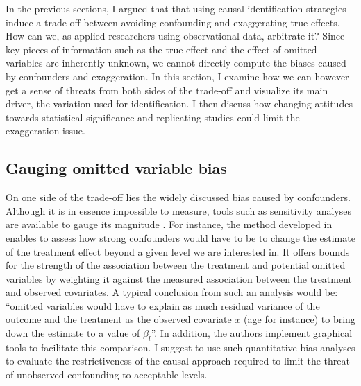 \documentclass[usletter, 12pt]{article}
\begin{document}
 		In the previous sections, I argued that that using causal identification strategies induce a trade-off between avoiding confounding and exaggerating true effects. How can we, as applied researchers using observational data, arbitrate it? Since key pieces of information such as the true effect and the effect of omitted variables are inherently unknown, we cannot directly compute the biases caused by confounders and exaggeration. In this section, I examine how we can however get a sense of threats from both sides of the trade-off and visualize its main driver, the variation used for identification. I then discuss how changing attitudes towards statistical significance and replicating studies could limit the exaggeration issue.
	
	
		\subsection{Gauging omitted variable bias}
	
			On one side of the trade-off lies the widely discussed bias caused by confounders. Although it is in essence impossible to measure, tools such as sensitivity analyses are available to gauge its magnitude \citep{rosenbaum_observational_2002, middleton_bias_2016, oster_unobservable_2019, cinelli_making_2020}. For instance, the method developed in \cite{cinelli_making_2020} enables to assess how strong confounders would have to be to change the estimate of the treatment effect beyond a given level we are interested in. It offers bounds for the strength of the association between the treatment and potential omitted variables by weighting it against the measured association between the treatment and observed covariates. A typical conclusion from such an analysis would be: ``omitted variables would have to explain as much residual variance of the outcome and the treatment as the observed covariate $x$ (age for instance) to bring down the estimate to a value of $\beta_{l}$''. In addition, the authors implement graphical tools to facilitate this comparison. I suggest to use such quantitative bias analyses to evaluate the restrictiveness of the causal approach required to limit the threat of unobserved confounding to acceptable levels. 
			
\end{document}
